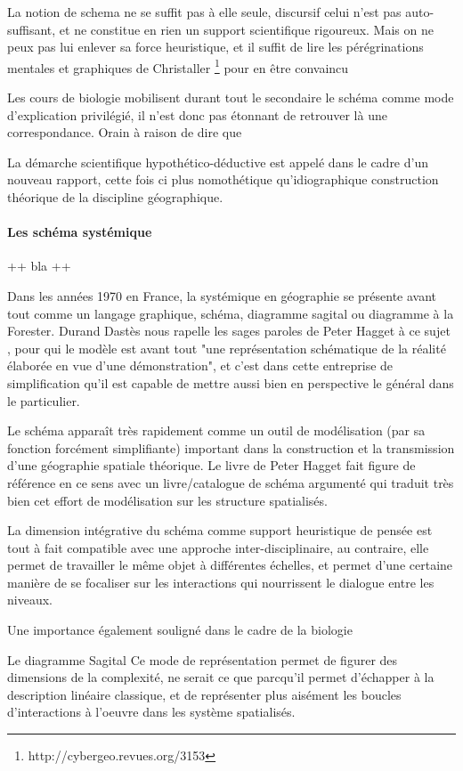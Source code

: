 {La notion de schema ne se suffit pas à elle seule, discursif celui n'est pas auto-suffisant, et ne constitue en rien un support scientifique rigoureux. Mais on ne peux pas lui enlever sa force heuristique, et il suffit de lire les pérégrinations mentales et graphiques de Christaller \footnote{http://cybergeo.revues.org/3153} pour en être convaincu 

Les cours de biologie mobilisent durant tout le secondaire le schéma comme mode d'explication privilégié, il n'est donc pas étonnant de retrouver là une correspondance. Orain à raison de dire que 

La démarche scientifique hypothético-déductive est appelé dans le cadre d'un nouveau rapport, cette fois ci plus nomothétique qu'idiographique construction théorique de la discipline géographique.


\paragraph{Les schéma systémique}

++ bla ++

Dans les années 1970 en France, la systémique en géographie se présente avant tout comme un langage graphique, schéma, diagramme sagital ou diagramme à la Forester. Durand Dastès nous rapelle les sages paroles de Peter Hagget à ce sujet , pour qui le modèle est avant tout "une représentation schématique de la réalité élaborée en vue d'une démonstration", et c'est dans cette entreprise de simplification qu'il est capable de mettre aussi bien en perspective le général dans le particulier. 

Le schéma apparaît très rapidement comme un outil de modélisation (par sa fonction forcément simplifiante) important dans la construction et la transmission d'une géographie spatiale théorique. Le livre de Peter Hagget fait figure de référence en ce sens avec un livre/catalogue de schéma argumenté qui traduit très bien cet effort de modélisation sur les structure spatialisés. 

La dimension intégrative du schéma comme support heuristique de pensée est tout à fait compatible avec une approche inter-disciplinaire, au contraire, elle permet de travailler le même objet à différentes échelles, et permet d'une certaine manière de se focaliser sur les interactions qui nourrissent le dialogue entre les niveaux.

Une importance également souligné dans le cadre de la biologie 

Le diagramme Sagital
Ce mode de représentation permet de figurer des dimensions de la complexité, ne serait ce que parcqu'il permet d'échapper à la description linéaire classique, et de représenter plus aisément les boucles d'interactions à l'oeuvre dans les système spatialisés. 

}
